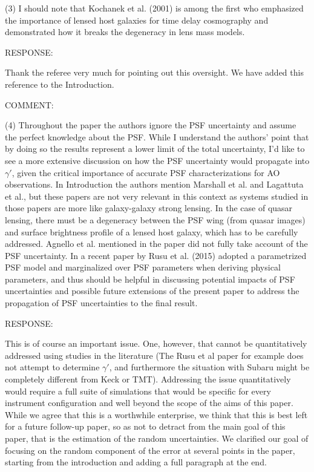 \documentclass[a4paper,11pt]{article}
\begin{document}
(3) I should note that Kochanek et al. (2001) is among the first 
who emphasized the importance of lensed host galaxies 
for time delay cosmography and demonstrated 
how it breaks the degeneracy in lens mass models.


RESPONSE:

Thank the referee very much for pointing out this oversight.  We have
added this reference to the Introduction.

COMMENT:

(4) Throughout the paper the authors ignore the PSF uncertainty and
assume the perfect knowledge about the PSF. While I understand the
authors' point that by doing so the results represent a lower limit of
the total uncertainty, I'd like to see a more extensive discussion on
how the PSF uncertainty would propagate into $\gamma'$, given the
critical importance of accurate PSF characterizations for AO
observations. In Introduction the authors mention Marshall et al. and
Lagattuta et al., but these papers are not very relevant in this
context as systems studied in those papers are more like galaxy-galaxy
strong lensing. In the case of quasar lensing, there must be a
degeneracy between the PSF wing (from quasar images) and surface
brightness profile of a lensed host galaxy, which has to be carefully
addressed. Agnello et al. mentioned in the paper did not fully take
account of the PSF uncertainty. In a recent paper by Rusu et
al. (2015) adopted a parametrized PSF model and marginalized over PSF
parameters when deriving physical parameters, and thus should be
helpful in discussing potential impacts of PSF uncertainties and
possible future extensions of the present paper to address the
propagation of PSF uncertainties to the final result.

RESPONSE:

This is of course an important issue. One, however, that cannot be
quantitatively addressed using studies in the literature (The Rusu et
al paper for example does not attempt to determine $\gamma'$, and
furthermore the situation with Subaru might be completely different
from Keck or TMT). Addressing the issue quantitatively would require a
full suite of simulations that would be specific for every instrument
configuration and well beyond the scope of the aims of this
paper. While we agree that this is a worthwhile enterprise, we think
that this is best left for a future follow-up paper, so as not to
detract from the main goal of this paper, that is the estimation of
the random uncertainties. We clarified our goal of focusing on the
random component of the error at several points in the paper, starting
from the introduction and adding a full paragraph at the end.
\end{document}

